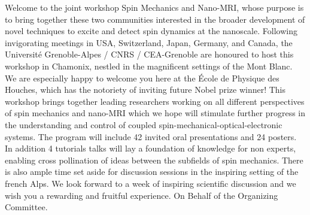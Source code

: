 Welcome to the joint workshop Spin Mechanics and Nano-MRI, whose
purpose is to bring together these two communities interested in the
broader development of novel techniques to excite and detect spin
dynamics at the nanoscale. Following invigorating meetings in USA,
Switzerland, Japan, Germany, and Canada, the Université Grenoble-Alpes
/ CNRS / CEA-Grenoble are honoured to host this workshop in Chamonix,
nestled in the magnificent settings of the Mont Blanc. We are
especially happy to welcome you here at the \'Ecole de Physique des
Houches, which has the notoriety of inviting future Nobel prize
winner! This workshop brings together leading researchers working on
all different perspectives of spin mechanics and nano-MRI which we
hope will stimulate further progress in the understanding and control
of coupled spin-mechanical-optical-electronic systems.  The program
will include 42 invited oral presentations and 24 posters. In addition
4 tutorials talks will lay a foundation of knowledge for non experts,
enabling cross pollination of ideas between the subfields of spin
mechanics. There is also ample time set aside for discussion sessions
in the inspiring setting of the french Alps.  We look forward to a
week of inspiring scientific discussion and we wish you a rewarding
and fruitful experience.  On Behalf of the Organizing Committee.
